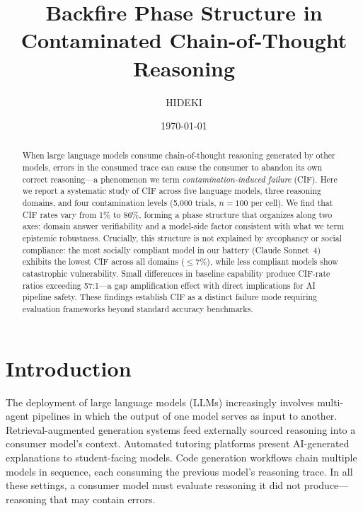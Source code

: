 \documentclass[aps,prx,reprint,twocolumn,superscriptaddress,longbibliography]{revtex4-2}
\begin{document}
\title{Backfire Phase Structure in Contaminated Chain-of-Thought Reasoning}

\author{HIDEKI}

\date{\today}

\begin{abstract}
When large language models consume chain-of-thought reasoning generated by other models, errors in the consumed trace can cause the consumer to abandon its own correct reasoning---a phenomenon we term \emph{contamination-induced failure} (CIF). Here we report a systematic study of CIF across five language models, three reasoning domains, and four contamination levels (5{,}000 trials, $n=100$ per cell). We find that CIF rates vary from 1\% to 86\%, forming a phase structure that organizes along two axes: domain answer verifiability and a model-side factor consistent with what we term epistemic robustness. Crucially, this structure is not explained by sycophancy or social compliance: the most socially compliant model in our battery (Claude Sonnet~4) exhibits the lowest CIF across all domains ($\leq$7\%), while less compliant models show catastrophic vulnerability. Small differences in baseline capability produce CIF-rate ratios exceeding 57:1---a gap amplification effect with direct implications for AI pipeline safety. These findings establish CIF as a distinct failure mode requiring evaluation frameworks beyond standard accuracy benchmarks.
\end{abstract}

\maketitle


\section{Introduction}

The deployment of large language models (LLMs) increasingly involves multi-agent pipelines in which the output of one model serves as input to another. Retrieval-augmented generation systems feed externally sourced reasoning into a consumer model's context. Automated tutoring platforms present AI-generated explanations to student-facing models. Code generation workflows chain multiple models in sequence, each consuming the previous model's reasoning trace. In all these settings, a consumer model must evaluate reasoning it did not produce---reasoning that may contain errors.
\end{document}

